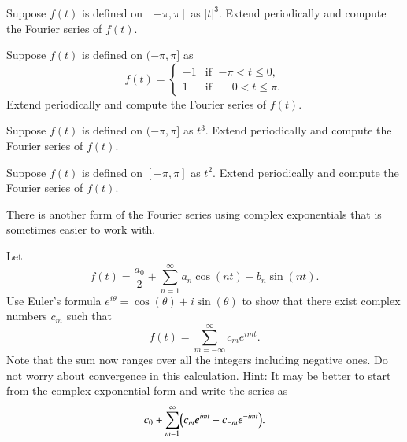 \documentclass[12pt]{book}
\begin{document}
\begin{exercise}
Suppose $f(t)$ is defined on $[-\pi,\pi]$ as $\lvert t \rvert^3$.
Extend periodically and compute the Fourier series of $f(t)$.
\end{exercise}

\begin{exercise}
Suppose $f(t)$ is defined on $(-\pi,\pi]$ as
\begin{equation*}
f(t) =
\begin{cases}
-1 & \text{if } \; {-\pi} < t \leq 0 , \\
1 & \text{if } \; \phantom{-}0 < t \leq \pi .
\end{cases}
\end{equation*}
Extend periodically and compute the Fourier series of $f(t)$.
\end{exercise}

\begin{exercise}
Suppose $f(t)$ is defined on $(-\pi,\pi]$ as $t^3$.
Extend periodically and compute the Fourier series of $f(t)$.
\end{exercise}

\begin{exercise}
Suppose $f(t)$ is defined on $[-\pi,\pi]$ as $t^2$.
Extend periodically and compute the Fourier series of $f(t)$.
\end{exercise}

There is another form of the Fourier series using complex exponentials
that is sometimes easier to work with.

\begin{exercise}
Let 
\begin{equation*}
f(t) = \frac{a_0}{2} + \sum_{n=1}^\infty a_n \cos (n t)
+ b_n \sin (n t) .
\end{equation*}
Use Euler's formula $e^{i\theta} = \cos (\theta) + i \sin (\theta)$ to
show that there exist complex numbers $c_m$ such that
\begin{equation*}
f(t) = 
\sum_{m=-\infty}^\infty c_m e^{imt} .
\end{equation*}
Note that the sum now ranges over all the integers including negative ones.
Do not worry about convergence in this calculation.
Hint: It may be better to start from the complex exponential form and write
the series as
\begin{equation*}
c_0 + \sum_{m=1}^\infty \Bigl( c_m e^{imt} + c_{-m} e^{-imt}  \Bigr).
\end{equation*}
\end{exercise}
\end{document}
